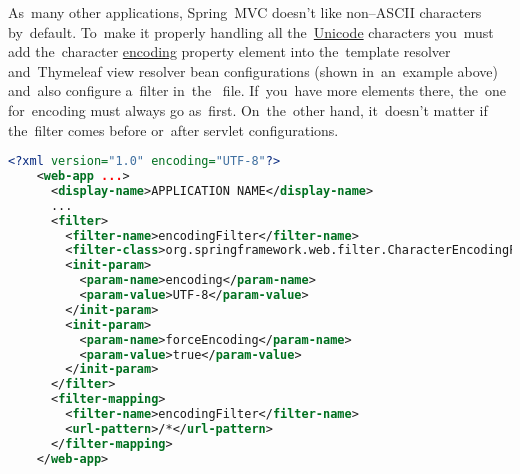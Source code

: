 As~many other applications, Spring~MVC doesn't like non--ASCII characters by~default.
To~make it properly handling all the~\hyperref[charactersetencoding]{Unicode} characters you~must add the~character \hyperref[charactersetencoding]{encoding} property element into the~template resolver and~Thymeleaf view resolver bean configurations (shown in~an~example above) and~also configure a~filter in~the~ file.
If~you~have more  elements there, the~one for~encoding must always go as~first.
On~the~other hand, it~doesn't matter if the~filter comes before or~after servlet configurations.

\begin{lstlisting}[language=XML, title=Example of a~\textit{web.xml} file with encoding filter configuration]
    <?xml version="1.0" encoding="UTF-8"?>
    <web-app ...>
      <display-name>APPLICATION NAME</display-name>
      ...
      <filter>
        <filter-name>encodingFilter</filter-name>
        <filter-class>org.springframework.web.filter.CharacterEncodingFilter </filter-class>
        <init-param>
          <param-name>encoding</param-name>
          <param-value>UTF-8</param-value>
        </init-param>
        <init-param>
          <param-name>forceEncoding</param-name>
          <param-value>true</param-value>
        </init-param>
      </filter>
      <filter-mapping>
        <filter-name>encodingFilter</filter-name>
        <url-pattern>/*</url-pattern>
      </filter-mapping>
    </web-app>
\end{lstlisting}
\newpage
